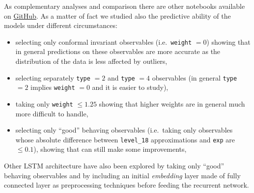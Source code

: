 As complementary analyses and comparison there are other notebooks available on \href{https://github.com/thesfinox/ml-sft-trunc/tree/model-dep}{GitHub}.
As a matter of fact we studied also the predictive ability of the models under different circumstances:
\begin{itemize}

  \item selecting only conformal invariant observables (i.e.\ \texttt{weight} $= 0$) showing that in general predictions on these observables are more accurate as the distribution of the data is less affected by outliers,
  
  \item selecting separately \texttt{type} $= 2$ and \texttt{type} $= 4$ observables (in general \texttt{type} $= 2$ implies \texttt{weight} $= 0$ and it is easier to study),

  \item taking only \texttt{weight} $\le 1.25$ showing that higher weights are in general much more difficult to handle,
    
  \item selecting only ``good'' behaving observables (i.e.\ taking only observables whose absolute difference between \texttt{level\_18} approximations and \texttt{exp} are $\le 0.1$), showing that \ml can still make some improvements,

\end{itemize}
Other LSTM architecture have also been explored by taking only ``good'' behaving observables and by including an initial \emph{embedding} layer made of fully connected layer as preprocessing techniques before feeding the recurrent network.



